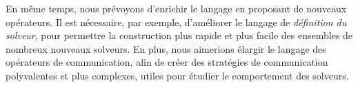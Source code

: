 \documentclass{jfpc-preprint}
\begin{document}
En même temps, nous prévoyons d'enrichir le langage en proposant de nouveaux opérateurs. Il est nécessaire, par exemple, d'améliorer le langage de {\it définition du solveur}, pour permettre la construction plus rapide et plus facile des ensembles de nombreux nouveaux solveurs. En plus, nous aimerions élargir le langage des opérateurs de communication, afin de créer des stratégies de communication polyvalentes et plus complexes, utiles pour étudier le comportement des solveurs.


\end{document}
